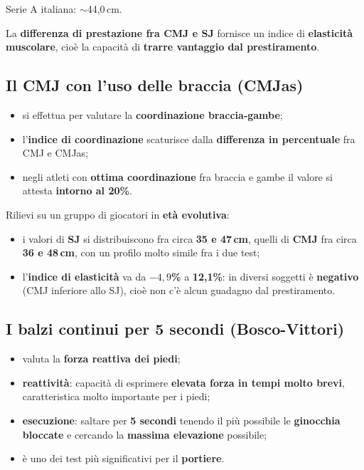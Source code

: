 Serie A italiana: $\sim$44,0\,cm.

La \textbf{differenza di prestazione fra CMJ e SJ} fornisce un indice di \textbf{elasticità
muscolare}, cioè la capacità di \textbf{trarre vantaggio dal prestiramento}.

\subsection{Il CMJ con l'uso delle braccia (CMJas)}

\begin{itemize}
  \item si effettua per valutare la \textbf{coordinazione braccia-gambe};
  \item l'\textbf{indice di coordinazione} scaturisce dalla \textbf{differenza in percentuale} fra
    CMJ e CMJas;
  \item negli atleti con \textbf{ottima coordinazione} fra braccia e gambe il valore si attesta
    \textbf{intorno al 20\%}.
\end{itemize}

Rilievi su un gruppo di giocatori in \textbf{età evolutiva}:
\begin{itemize}
  \item i valori di \textbf{SJ} si distribuiscono fra circa \textbf{35 e 47\,cm}, quelli di
    \textbf{CMJ} fra circa \textbf{36 e 48\,cm}, con un profilo molto simile fra i due test;
  \item l'\textbf{indice di elasticità} va da \textbf{$-4,9$\%} a \textbf{12,1\%}: in diversi
    soggetti è \textbf{negativo} (CMJ inferiore allo SJ), cioè non c'è alcun guadagno dal
    prestiramento.
\end{itemize}

\subsection{I balzi continui per 5 secondi (Bosco-Vittori)}

\begin{itemize}
  \item valuta la \textbf{forza reattiva dei piedi};
  \item \textbf{reattività}: capacità di esprimere \textbf{elevata forza in tempi molto brevi},
    caratteristica molto importante per i piedi;
  \item \textbf{esecuzione}: saltare per \textbf{5 secondi} tenendo il più possibile le
    \textbf{ginocchia bloccate} e cercando la \textbf{massima elevazione} possibile;
  \item è uno dei test più significativi per il \textbf{portiere}.
\end{itemize}

